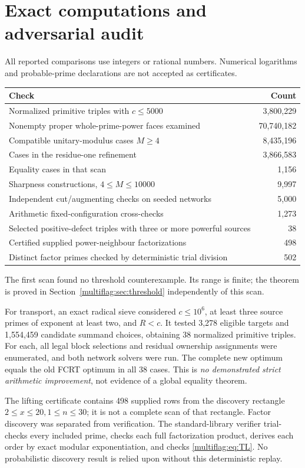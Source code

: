 \section{Exact computations and adversarial audit}\label{multiflag:sec:tests}
All reported comparisons use integers or rational numbers. Numerical logarithms and probable-prime declarations are not accepted as certificates.
\begin{center}\small
\begin{tabular}{p{91mm}r}\toprule
Check & Count\\\midrule
Normalized primitive triples with \(c\le5000\) & 3,800,229\\
Nonempty proper whole-prime-power faces examined & 70,740,182\\
Compatible unitary-modulus cases \(M\ge4\) & 8,435,196\\
Cases in the residue-one refinement & 3,866,583\\
Equality cases in that scan & 1,156\\
Sharpness constructions, \(4\le M\le10000\) & 9,997\\
Independent cut/augmenting checks on seeded networks & 5,000\\
Arithmetic fixed-configuration cross-checks & 1,273\\
Selected positive-defect triples with three or more powerful sources & 38\\
Certified supplied power-neighbour factorizations & 498\\
Distinct factor primes checked by deterministic trial division & 502\\\bottomrule
\end{tabular}
\end{center}
The first scan found no threshold counterexample. Its range is finite; the theorem is proved in Section~\ref{multiflag:sec:threshold} independently of this scan.

For transport, an exact radical sieve considered \(c\le10^6\), at least three source primes of exponent at least two, and \(R<c\). It tested 3,278 eligible targets and 1,554,459 candidate summand choices, obtaining 38 normalized primitive triples. For each, all legal block selections and residual ownership assignments were enumerated, and both network solvers were run. The complete new optimum equals the old FCRT optimum in all 38 cases. This is \emph{no demonstrated strict arithmetic improvement}, not evidence of a global equality theorem.

The lifting certificate contains 498 supplied rows from the discovery rectangle \(2\le x\le20,1\le n\le30\); it is not a complete scan of that rectangle. Factor discovery was separated from verification. The standard-library verifier trial-checks every included prime, checks each full factorization product, derives each order by exact modular exponentiation, and checks \eqref{multiflag:eq:TL}. No probabilistic discovery result is relied upon without this deterministic replay.

